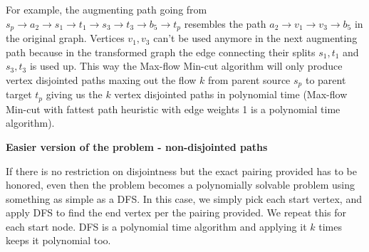 \documentclass{imports}
\begin{document}
    For example, the augmenting path going from $s_p \to a_2 \to s_1 \to t_1 \to s_3 \to t_3 \to b_5 \to t_p$ resembles the path
    $a_2 \to v_1 \to v_3 \to b_5$ in the original graph. Vertices $v_1, v_3$ can't be used anymore in the next augmenting path because in the transformed
    graph the edge connecting their splits $s_1, t_1$ and $s_3, t_3$ is used up. This way the Max-flow Min-cut algorithm will only produce 
    vertex disjointed paths maxing out the flow $k$ from parent source $s_p$ to parent target $t_p$ giving us the $k$ vertex disjointed paths in polynomial time 
    (Max-flow Min-cut with fattest path heuristic with edge weights 1 is a polynomial time algorithm).\vspace{10pt}


    \textbf{Easier version of the problem - non-disjointed paths} \vspace{10pt}

    If there is no restriction on disjointness but the exact pairing provided has to be honored, even then the problem becomes a 
    polynomially solvable problem using something as simple as a DFS. In this case, we simply pick each start vertex, and apply DFS to find
    the end vertex per the pairing provided. We repeat this for each start node. DFS is a polynomial time algorithm and applying it $k$ times
    keeps it polynomial too.

    \vspace{10pt}
    \cite{team}
    \newpage
    
    
\end{document}
